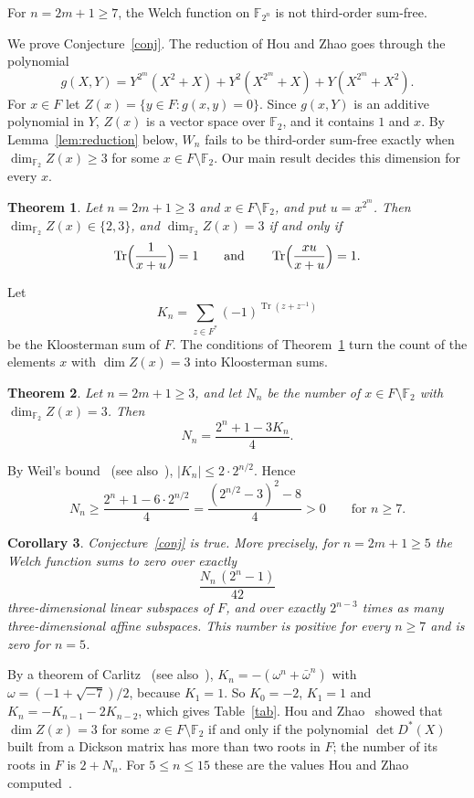 \documentclass[11pt]{amsart}
\newtheorem{theorem}{Theorem}[section]
\newtheorem{corollary}[theorem]{Corollary}
\theoremstyle{definition}
\newenvironment{conjecture}[1]{\renewcommand{\theinnerconj}{#1}\innerconj}{\endinnerconj}
\theoremstyle{remark}
\numberwithin{equation}{section}
\newcommand{\F}{\mathbb{F}}
\newcommand{\Tr}{\operatorname{Tr}}
\begin{document}
\begin{conjecture}{1}\label{conj}
For $n=2m+1\ge7$, the Welch function on $\F_{2^n}$ is not third-order sum-free.
\end{conjecture}

We prove Conjecture~\ref{conj}. The reduction of Hou and Zhao goes through the polynomial
\begin{equation}\label{eq:g}
g(X,Y)=Y^{2^m}(X^2+X)+Y^2(X^{2^m}+X)+Y(X^{2^m}+X^2).
\end{equation}
For $x\in F$ let $Z(x)=\{y\in F: g(x,y)=0\}$. Since $g(x,Y)$ is an additive polynomial in $Y$, $Z(x)$ is a vector space over $\F_2$, and it contains $1$ and $x$. By Lemma~\ref{lem:reduction} below, $W_n$ fails to be third-order sum-free exactly when $\dim_{\F_2}Z(x)\ge3$ for some $x\in F\setminus\F_2$. Our main result decides this dimension for every $x$.

\begin{theorem}\label{thm:criterion}
Let $n=2m+1\ge3$ and $x\in F\setminus\F_2$, and put $u=x^{2^m}$. Then $\dim_{\F_2}Z(x)\in\{2,3\}$, and $\dim_{\F_2}Z(x)=3$ if and only if
\[
\Tr\Bigl(\frac{1}{x+u}\Bigr)=1\qquad\text{and}\qquad\Tr\Bigl(\frac{xu}{x+u}\Bigr)=1 .
\]
\end{theorem}

Let
\[
K_n=\sum_{z\in F^*}(-1)^{\Tr(z+z^{-1})}
\]
be the Kloosterman sum of $F$. The conditions of Theorem~\ref{thm:criterion} turn the count of the elements $x$ with $\dim Z(x)=3$ into Kloosterman sums.

\begin{theorem}\label{thm:count}
Let $n=2m+1\ge3$, and let $N_n$ be the number of $x\in F\setminus\F_2$ with $\dim_{\F_2}Z(x)=3$. Then
\[
N_n=\frac{2^n+1-3K_n}{4}.
\]
\end{theorem}

By Weil's bound~\cite{Weil} (see also~\cite[Chapter~5]{LN}), $|K_n|\le2\cdot2^{n/2}$. Hence
\[
N_n\ge\frac{2^n+1-6\cdot2^{n/2}}{4}=\frac{(2^{n/2}-3)^2-8}{4}>0\qquad\text{for }n\ge7 .
\]

\begin{corollary}\label{cor:conj}
Conjecture~\ref{conj} is true. More precisely, for $n=2m+1\ge5$ the Welch function sums to zero over exactly
\[
\frac{N_n\,(2^n-1)}{42}
\]
three-dimensional linear subspaces of $F$, and over exactly $2^{n-3}$ times as many three-dimensional affine subspaces. This number is positive for every $n\ge7$ and is zero for $n=5$.
\end{corollary}

By a theorem of Carlitz~\cite{Carlitz} (see also~\cite[Chapter~5]{LN}), $K_n=-(\omega^n+\bar\omega^n)$ with $\omega=(-1+\sqrt{-7})/2$, because $K_1=1$. So $K_0=-2$, $K_1=1$ and $K_n=-K_{n-1}-2K_{n-2}$, which gives Table~\ref{tab}. Hou and Zhao~\cite[Corollary~4.9]{HZ} showed that $\dim Z(x)=3$ for some $x\in F\setminus\F_2$ if and only if the polynomial $\det D^*(X)$ built from a Dickson matrix has more than two roots in $F$; the number of its roots in $F$ is $2+N_n$. For $5\le n\le15$ these are the values Hou and Zhao computed~\cite[Table~1]{HZ}.
\end{document}
